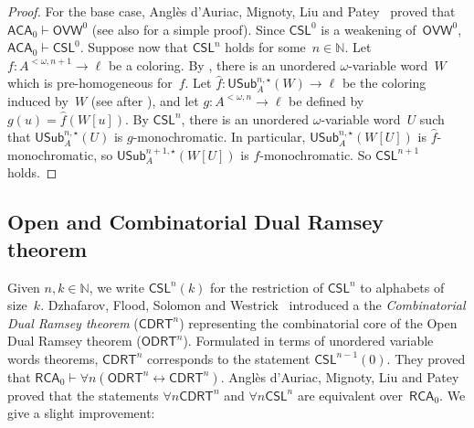 \documentclass{article}
\newcommand{\RCA}[0]{\mathsf{RCA}}
\newcommand{\ACA}[0]{\mathsf{ACA}}
\newcommand{\CSL}[0]{\mathsf{CSL}}
\newcommand{\OVW}[0]{\mathsf{OVW}}
\newcommand{\ODRT}[0]{\mathsf{ODRT}}
\newcommand{\CDRT}[0]{\mathsf{CDRT}}
\newcommand{\NN}[0]{\mathbb{N}}
\newcommand{\USub}{\mathsf{USub}}
\numberwithin{theorem}{section}
\newtheorem{proposition}[theorem]{Proposition}
\theoremstyle{definition}
\begin{document}
\begin{proof}
For the base case, Anglès d’Auriac, Mignoty, Liu and Patey~\cite{angles2023carlson} proved that $\ACA_0 \vdash \OVW^0$ (see also  for a simple proof). Since $\CSL^0$ is a weakening of~$\OVW^0$, $\ACA_0 \vdash \CSL^0$.
Suppose now that $\CSL^n$ holds for some~$n \in \NN$.
Let $f : A^{<\omega, n+1} \to \ell$ be a coloring.
By , there is an unordered $\omega$-variable word~$W$ which is pre-homogeneous for~$f$.
Let $\hat f : \USub^{n,\star}_A(W) \to \ell$ be the coloring induced by~$W$ (see after ), and let $g : A^{<\omega, n} \to \ell$ be defined by $g(u) = \hat f(W[u])$.
By $\CSL^n$, there is an unordered $\omega$-variable word~$U$ such that $\USub^{n,\star}_A(U)$ is $g$-monochromatic.
In particular, $\USub^{n,\star}_A(W[U])$ is $\hat f$-monochromatic, so $\USub^{n+1,\star}_A(W[U])$ is $f$-monochromatic.
So $\CSL^{n+1}$ holds.
\end{proof}

\subsection{Open and Combinatorial Dual Ramsey theorem}

Given $n, k \in \NN$, we write $\CSL^n(k)$ for the restriction of $\CSL^n$ to alphabets of size~$k$.
Dzhafarov, Flood, Solomon and Westrick~\cite{dzhafarov2021effectiveness} introduced a the \emph{Combinatorial Dual Ramsey theorem} ($\CDRT^n$) representing the combinatorial core of the Open Dual Ramsey theorem ($\ODRT^n$). Formulated in terms of unordered variable words theorems, $\CDRT^n$ corresponds to the statement $\CSL^{n-1}(0)$. They proved that $\RCA_0 \vdash \forall n (\ODRT^n \leftrightarrow \CDRT^n)$. Anglès d’Auriac, Mignoty, Liu and Patey~\cite{angles2023carlson} proved that the statements $\forall n \CDRT^n$ and $\forall n \CSL^n$ are equivalent over~$\RCA_0$. We give a slight improvement:
\end{document}
